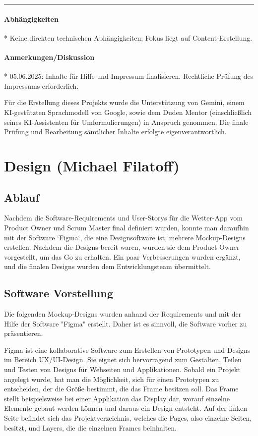 \documentclass{article}
\begin{document}
\vspace{0.5em}
\hrule

\paragraph{Abhängigkeiten}
* Keine direkten technischen Abhängigkeiten; Fokus liegt auf Content-Erstellung.

\paragraph{Anmerkungen/Diskussion}
* 05.06.2025: Inhalte für Hilfe und Impressum finalisieren. Rechtliche Prüfung des Impressums erforderlich.

\vfill
\small 
Für die Erstellung dieses Projekts wurde die Unterstützung von Gemini, einem KI-gestützten Sprachmodell von Google, sowie dem Duden Mentor (einschließlich seines KI-Assistenten für Umformulierungen) in Anspruch genommen. Die finale Prüfung und Bearbeitung sämtlicher Inhalte erfolgte eigenverantwortlich.
\normalsize

\section{Design \small{(Michael Filatoff)}}
\subsection{Ablauf}
Nachdem die Software-Requirements und User-Storys für die Wetter-App vom Product Owner und Scrum Master final definiert wurden, konnte man daraufhin mit der Software `Figma`, die eine Designsoftware ist, mehrere Mockup-Designs erstellen. Nachdem die Designs bereit waren, wurden sie dem Product Owner vorgestellt, um das Go zu erhalten. Ein paar Verbesserungen wurden ergänzt, und die finalen Designs wurden dem Entwicklungsteam übermittelt.

\subsection{Software Vorstellung}
Die folgenden Mockup-Designs wurden anhand der Requirements und mit der Hilfe der Software "Figma" erstellt. Daher ist es sinnvoll, die Software vorher zu präsentieren.

Figma ist eine kollaborative Software zum Erstellen von Prototypen und Designs im Bereich UX/UI-Design. Sie eignet sich hervorragend zum Gestalten, Teilen und Testen von Designs für Webseiten und Applikationen. Sobald ein Projekt angelegt wurde, hat man die Möglichkeit, sich für einen Prototypen zu entscheiden, der die Größe bestimmt, die das Frame besitzen soll. Das Frame stellt beispielsweise bei einer Applikation das Display dar, worauf einzelne Elemente gebaut werden können und daraus ein Design entsteht. Auf der linken Seite  befindet sich das Projektverzeichnis, welches die Pages, also einzelne Seiten, besitzt, und Layers, die die einzelnen Frames beinhalten. 
\end{document}
